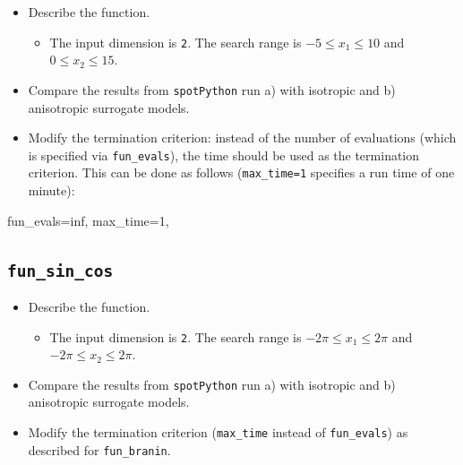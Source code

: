 \documentclass[
  letterpaper,
  DIV=11,
  numbers=noendperiod]{scrreprt}
\newenvironment{Shaded}{\begin{snugshade}}{\end{snugshade}}
\newcommand{\DecValTok}[1]{\textcolor[rgb]{0.68,0.00,0.00}{#1}}
\newcommand{\NormalTok}[1]{\textcolor[rgb]{0.00,0.23,0.31}{#1}}
\newcommand{\OperatorTok}[1]{\textcolor[rgb]{0.37,0.37,0.37}{#1}}
\providecommand{\tightlist}{%
  \setlength{\itemsep}{0pt}\setlength{\parskip}{0pt}}\usepackage{longtable,booktabs,array}
\begin{document}
\begin{itemize}
\tightlist
\item
  Describe the function.

  \begin{itemize}
  \tightlist
  \item
    The input dimension is \texttt{2}. The search range is
    \(-5 \leq x_1 \leq 10\) and \(0 \leq x_2 \leq 15\).
  \end{itemize}
\item
  Compare the results from \texttt{spotPython} run a) with isotropic and
  b) anisotropic surrogate models.
\item
  Modify the termination criterion: instead of the number of evaluations
  (which is specified via \texttt{fun\_evals}), the time should be used
  as the termination criterion. This can be done as follows
  (\texttt{max\_time=1} specifies a run time of one minute):
\end{itemize}

\begin{Shaded}
\begin{Highlighting}[]
\NormalTok{fun\_evals}\OperatorTok{=}\NormalTok{inf,}
\NormalTok{max\_time}\OperatorTok{=}\DecValTok{1}\NormalTok{,}
\end{Highlighting}
\end{Shaded}

\hypertarget{fun_sin_cos}{%
\subsection{\texorpdfstring{\texttt{fun\_sin\_cos}}{fun\_sin\_cos}}\label{fun_sin_cos}}

\begin{itemize}
\tightlist
\item
  Describe the function.

  \begin{itemize}
  \tightlist
  \item
    The input dimension is \texttt{2}. The search range is
    \(-2\pi \leq x_1 \leq 2\pi\) and \(-2\pi \leq x_2 \leq 2\pi\).
  \end{itemize}
\item
  Compare the results from \texttt{spotPython} run a) with isotropic and
  b) anisotropic surrogate models.
\item
  Modify the termination criterion (\texttt{max\_time} instead of
  \texttt{fun\_evals}) as described for \texttt{fun\_branin}.
\end{itemize}
\end{document}
